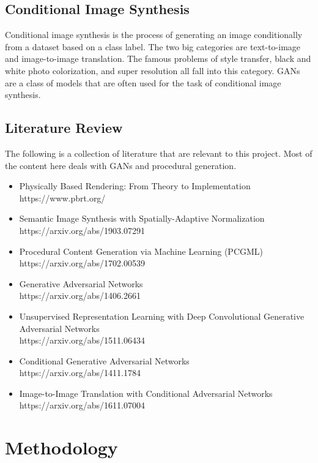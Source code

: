 \documentclass{article}
\begin{document}
	\subsection{Conditional Image Synthesis}
	
	Conditional image synthesis is the process of generating an image conditionally from a dataset based on a class label. The two big categories are text-to-image and image-to-image translation. The famous problems of style transfer, black and white photo colorization, and super resolution all fall into this category. GANs are a class of models that are often used for the task of conditional image synthesis.
		
	\subsection{Literature Review}

	The following is a collection of literature that are relevant to this project. Most of the content here deals with GANs and procedural generation.

	\begin{itemize}
		\item Physically Based Rendering: From Theory to Implementation\\
		https://www.pbrt.org/
		\item Semantic Image Synthesis with Spatially-Adaptive Normalization\\
		https://arxiv.org/abs/1903.07291
		\item Procedural Content Generation via Machine Learning (PCGML)\\
		https://arxiv.org/abs/1702.00539	
		\item Generative Adversarial Networks\\
		https://arxiv.org/abs/1406.2661
		\item Unsupervised Representation Learning with Deep Convolutional Generative Adversarial Networks\\
		https://arxiv.org/abs/1511.06434
		\item Conditional Generative Adversarial Networks\\
		https://arxiv.org/abs/1411.1784
		\item Image-to-Image Translation with Conditional Adversarial Networks\\
		https://arxiv.org/abs/1611.07004		
	\end{itemize}
	
	\section{Methodology}
	
\end{document}
